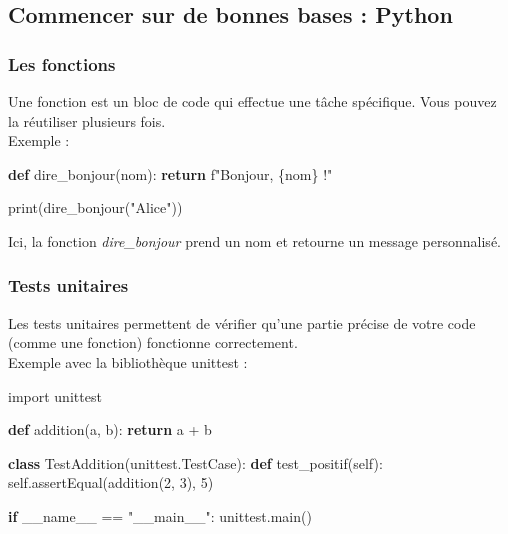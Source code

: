 \documentclass[
  letterpaper,
  DIV=11,
  numbers=noendperiod]{scrartcl}
\newenvironment{Shaded}{\begin{snugshade}}{\end{snugshade}}
\newcommand{\BuiltInTok}[1]{\textcolor[rgb]{0.00,0.23,0.31}{#1}}
\newcommand{\ControlFlowTok}[1]{\textcolor[rgb]{0.00,0.23,0.31}{\textbf{#1}}}
\newcommand{\DecValTok}[1]{\textcolor[rgb]{0.68,0.00,0.00}{#1}}
\newcommand{\ImportTok}[1]{\textcolor[rgb]{0.00,0.46,0.62}{#1}}
\newcommand{\KeywordTok}[1]{\textcolor[rgb]{0.00,0.23,0.31}{\textbf{#1}}}
\newcommand{\NormalTok}[1]{\textcolor[rgb]{0.00,0.23,0.31}{#1}}
\newcommand{\OperatorTok}[1]{\textcolor[rgb]{0.37,0.37,0.37}{#1}}
\newcommand{\SpecialCharTok}[1]{\textcolor[rgb]{0.37,0.37,0.37}{#1}}
\newcommand{\SpecialStringTok}[1]{\textcolor[rgb]{0.13,0.47,0.30}{#1}}
\newcommand{\StringTok}[1]{\textcolor[rgb]{0.13,0.47,0.30}{#1}}
\newcommand{\VariableTok}[1]{\textcolor[rgb]{0.07,0.07,0.07}{#1}}
\begin{document}
\subsection{Commencer sur de bonnes bases :
Python}\label{commencer-sur-de-bonnes-bases-python}

\subsubsection{Les fonctions}\label{les-fonctions}

Une fonction est un bloc de code qui effectue une tâche spécifique. Vous
pouvez la réutiliser plusieurs fois.\\
Exemple :

\begin{Shaded}
\begin{Highlighting}[]
\KeywordTok{def}\NormalTok{ dire\_bonjour(nom):}
    \ControlFlowTok{return} \SpecialStringTok{f"Bonjour, }\SpecialCharTok{\{}\NormalTok{nom}\SpecialCharTok{\}}\SpecialStringTok{ !"}

\BuiltInTok{print}\NormalTok{(dire\_bonjour(}\StringTok{"Alice"}\NormalTok{))}
\end{Highlighting}
\end{Shaded}

Ici, la fonction \emph{dire\_bonjour} prend un nom et retourne un
message personnalisé.

\subsubsection{Tests unitaires}\label{tests-unitaires}

Les tests unitaires permettent de vérifier qu'une partie précise de
votre code (comme une fonction) fonctionne correctement.\\
Exemple avec la bibliothèque unittest :

\begin{Shaded}
\begin{Highlighting}[]
\ImportTok{import}\NormalTok{ unittest}

\KeywordTok{def}\NormalTok{ addition(a, b):}
    \ControlFlowTok{return}\NormalTok{ a }\OperatorTok{+}\NormalTok{ b}

\KeywordTok{class}\NormalTok{ TestAddition(unittest.TestCase):}
    \KeywordTok{def}\NormalTok{ test\_positif(}\VariableTok{self}\NormalTok{):}
        \VariableTok{self}\NormalTok{.assertEqual(addition(}\DecValTok{2}\NormalTok{, }\DecValTok{3}\NormalTok{), }\DecValTok{5}\NormalTok{)}

\ControlFlowTok{if} \VariableTok{\_\_name\_\_} \OperatorTok{==} \StringTok{"\_\_main\_\_"}\NormalTok{:}
\NormalTok{    unittest.main()}
\end{Highlighting}
\end{Shaded}
\end{document}
